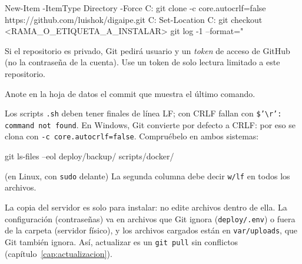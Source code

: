 \begin{codigo}
New-Item -ItemType Directory -Force C:\digaipe
git clone -c core.autocrlf=false https://github.com/luishok/digaipe.git C:\digaipe\app
Set-Location C:\digaipe\app
git checkout <RAMA_O_ETIQUETA_A_INSTALAR>
git log -1 --format="%
\end{codigo}

Si el repositorio es privado, Git pedirá usuario y un \emph{token} de acceso de GitHub (no la
contraseña de la cuenta). Use un token de solo lectura limitado a este repositorio.

Anote en la hoja de datos el commit que muestra el último comando.

\begin{aviso}
	Los scripts \texttt{.sh} deben tener finales de línea LF; con CRLF fallan con
	\texttt{\$'\textbackslash r': command not found}. En Windows, Git convierte por defecto a CRLF:
	por eso se clona con \texttt{-c core.autocrlf=false}. Compruébelo en ambos sistemas:
	\begin{codigo}
git ls-files --eol deploy/backup/ scripts/docker/
	\end{codigo}
	(en Linux, con \texttt{sudo} delante)
	La segunda columna debe decir \texttt{w/lf} en todos los archivos.
\end{aviso}

\begin{nota}
	La copia del servidor es solo para instalar: no edite archivos dentro de ella. La
	configuración (contraseñas) va en archivos que Git ignora (\texttt{deploy/.env}) o fuera de la
	carpeta (servidor físico), y los archivos cargados están en \texttt{var/uploads}, que Git
	también ignora. Así, actualizar es un \texttt{git pull} sin conflictos
	(capítulo~\ref{cap:actualizacion}).
\end{nota}
